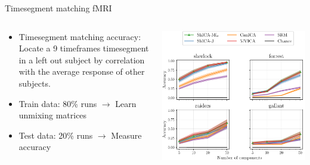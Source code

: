 \documentclass[bigger]{beamer}
\begin{document}
\begin{frame}{Timesegment matching fMRI}
  \begin{columns}[T] %
    \begin{column}{.4\textwidth}
      \begin{itemize}
      \item Timesegment matching accuracy: Locate a 9 timeframes timesegment in a left out subject by correlation with the average response of other subjects.
      \item Train data: 80\% runs $\rightarrow$ Learn unmixing matrices
      \item Test data: 20\% runs $\rightarrow$ Measure accuracy
      \end{itemize}
    \end{column}%
    \hfill%
    \begin{column}{.6\textwidth}

      \begin{center}
        \includegraphics[width=\linewidth]{./figures/timesegment_matching.pdf}
      \end{center}
    \end{column}%
  \end{columns}
\end{frame}
\end{document}
